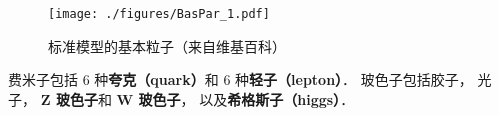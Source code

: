 
\begin{issues}
\issueDraft
\end{issues}

\begin{figure}[ht]
\centering
\texttt{[image: ./figures/BasPar\_1.pdf]}
\caption{标准模型的基本粒子（来自维基百科）} \label{BasPar_fig1}
\end{figure}

费米子包括 6 种\textbf{夸克（quark）}和 6 种\textbf{轻子（lepton）}． 玻色子包括胶子， 光子， \textbf{Z 玻色子}和 \textbf{W 玻色子}， 以及\textbf{希格斯子（higgs）}．
